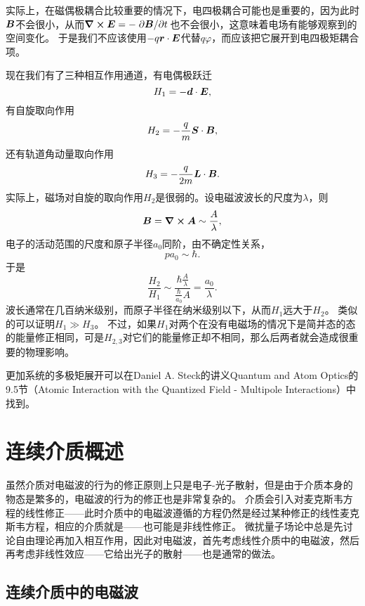 实际上，在磁偶极耦合比较重要的情况下，电四极耦合可能也是重要的，因为此时$\vb*{B}$不会很小，从而$\curl{\vb*{E}} = - \pdv*{\vb*{B}}{t}$也不会很小，这意味着电场有能够观察到的空间变化。
于是我们不应该使用$-q \vb*{r} \cdot \vb*{E}$代替$q \varphi$，而应该把它展开到电四极矩耦合项。

现在我们有了三种相互作用通道，有电偶极跃迁
\begin{equation}
    H_1 = - \vb*{d} \cdot \vb*{E},
\end{equation}
有自旋取向作用
\begin{equation}
    H_2 = - \frac{q}{m} \vb*{S} \cdot \vb*{B},
\end{equation}
还有轨道角动量取向作用
\begin{equation}
    H_3 = - \frac{q}{2m} \vb*{L} \cdot \vb*{B}.
\end{equation}
实际上，磁场对自旋的取向作用${H}_2$是很弱的。设电磁波波长的尺度为$\lambda$，则
\[
    \vb*{B} = \curl{\vb*{A}} \sim \frac{A}{\lambda},
\]
电子的活动范围的尺度和原子半径$a_0$同阶，由不确定性关系，
\[
    p a_0 \sim \hbar.
\]
于是
\[
    \frac{H_2}{H_1} \sim \frac{\hbar \frac{A}{\lambda}}{\frac{\hbar}{a_0} A} = \frac{a_0}{\lambda}.
\]
波长通常在几百纳米级别，而原子半径在纳米级别以下，从而${H}_1$远大于${H}_2$。
类似的可以证明$H_1 \gg H_3$。
不过，如果$H_1$对两个在没有电磁场的情况下是简并态的态的能量修正相同，可是$H_{2,3}$对它们的能量修正却不相同，那么后两者就会造成很重要的物理影响。

更加系统的多极矩展开可以在Daniel A. Steck的讲义Quantum and Atom Optics的9.5节（Atomic Interaction with the Quantized Field - Multipole Interactions）中找到。

\chapter{连续介质概述}

虽然介质对电磁波的行为的修正原则上只是电子-光子散射，但是由于介质本身的物态是繁多的，电磁波的行为的修正也是非常复杂的。
介质会引入对麦克斯韦方程的线性修正——此时介质中的电磁波遵循的方程仍然是经过某种修正的线性麦克斯韦方程，相应的介质就是——也可能是非线性修正。
微扰量子场论中总是先讨论自由理论再加入相互作用，因此对电磁波，首先考虑线性介质中的电磁波，然后再考虑非线性效应——它给出光子的散射——也是通常的做法。

\section{连续介质中的电磁波}

